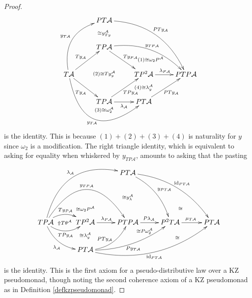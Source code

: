 \documentclass[a4paper,oneside,english]{amsart}
\numberwithin{equation}{section}
\numberwithin{figure}{section}
\theoremstyle{plain}
\theoremstyle{definition}
\theoremstyle{remark}
\theoremstyle{definition}
\theoremstyle{plain}
\theoremstyle{plain}
\theoremstyle{plain}
\begin{document}
\begin{proof}
\[
\xymatrix@=1em{ &  & PT\mathcal{A}\ar@/^{2pc}/[rrddrrdd]^{PTy_{\mathcal{A}}}\\
\\
 &  & TP\mathcal{A}\ar[rrdd]^{Ty_{P\mathcal{A}}}\ar@/^{1.5pc}/[rrrrdd]^{y_{TP\mathcal{A}}}\ar@{}[dddd]|-{\left(2\right)\cong Ty_{y}^{\mathcal{A}}}\ar@{}[uu]|-{\cong y_{Ty}^{\mathcal{A}}} &  & \;\ar@{}[dd]|-{\quad\quad\left(1\right)\cong\omega_{2}P^{\mathcal{A}}}\\
\\
T\mathcal{A}\ar[rruu]^{Ty_{\mathcal{A}}}\ar[rrdd]_{Ty_{\mathcal{A}}}\ar@/_{4pc}/[rrddrr]_{y_{T\mathcal{A}}}\ar@/^{2pc}/[uurruu]^{y_{T\mathcal{A}}} &  &  &  & TP^{2}\mathcal{A}\ar[rr]^{\lambda_{P\mathcal{A}}}\ar@{}[dd]|-{\left(4\right)\cong\lambda_{y}^{\mathcal{A}}} &  & PTP\mathcal{A}\\
\\
 &  & TP\mathcal{A}\ar[rruu]_{TPy_{\mathcal{A}}}\ar[rr]_{\lambda_{\mathcal{A}}}\ar@{}[d]|-{\left(3\right)\cong\omega_{2}^{\mathcal{A}}} &  & PT\mathcal{A}\ar[uurr]_{PTy_{\mathcal{A}}}\\
 &  & \;
}
\]
is the identity. This is because $\left(1\right)+\left(2\right)+\left(3\right)+\left(4\right)$
is naturality for $y$ since $\omega_{2}$ is a modification. The
right triangle identity, which is equivalent to asking for equality
when whiskered by $y_{TP\mathcal{A}}$, amounts to asking that the
pasting

\[
\xymatrix@=1em{ &  &  &  & PT\mathcal{A}\ar@/^{1pc}/[ddddrr]^{y_{PT\mathcal{A}}}\ar@/^{1.5pc}/[ddddrrrr]^{\textnormal{id}_{PT\mathcal{A}}}\\
\\
\\
 &  & \ar@{}[]|-{\cong\omega_{2}P^{\mathcal{A}}} &  &  &  & \ar@{}[r]|-{\cong} & \;\\
TP\mathcal{A}\ar@/^{1pc}/[rr]^{Ty_{P\mathcal{A}}}\ar@/_{1pc}/[rr]_{TPy_{\mathcal{A}}}\ar@{}[rr]|-{\Uparrow T\theta^{\mathcal{A}}}\ar@/^{4pc}/[rrrr]^{y_{TP\mathcal{A}}}\ar@/_{1pc}/[rrdd]_{\lambda_{\mathcal{A}}}\ar@/^{3pc}/[rrrruuuu]^{\lambda_{\mathcal{A}}} &  & TP^{2}\mathcal{A}\ar[rr]^{\lambda_{P\mathcal{A}}} &  & PTP\mathcal{A}\ar[rr]^{P\lambda_{\mathcal{A}}}\ar@{}[uuuu]|-{\cong y_{\lambda}^{\mathcal{A}}} &  & P^{2}T\mathcal{A}\ar[rr]^{\mu_{T\mathcal{A}}} &  & PT\mathcal{A}\\
 &  & \; &  & \;\ar@{}[rru]|-{\cong P\omega_{2}^{\mathcal{A}}}\\
 &  & PT\mathcal{A}\ar@/_{1pc}/[rruu]^{PTy_{\mathcal{A}}}\ar@{}[uu]|-{\cong\lambda_{y}^{\mathcal{A}}}\ar@/_{1pc}/[rruurr]_{Py_{T\mathcal{A}}}\ar@/_{2pc}/[rruurrrr]_{\textnormal{id}_{PT\mathcal{A}}} &  &  & \ar@{}[rruur]|-{\cong}
}
\]
is the identity. This is the first axiom for a pseudo-distributive
law over a KZ pseudomonad, though noting the second coherence axiom
of a KZ pseudomonad as in Definition \ref{defkzpseudomonad}.


\end{proof}
\end{document}
